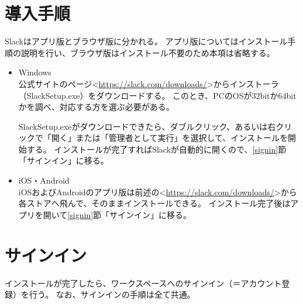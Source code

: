 \documentclass[lualatex,ja=standard,12pt,a4j]{bxjsbook}
\begin{document}
        \section{導入手順}
        	Slackはアプリ版とブラウザ版に分かれる。
            アプリ版についてはインストール手順の説明を行い、ブラウザ版はインストール不要のため本項は省略する。
        	\begin{itemize} 
            	\item Windows\\
                	公式サイトのページ<\url{https://slack.com/downloads/}>からインストーラ（SlackSetup.exe）をダウンロードする。
                    このとき、PCのOSが32bitか64bitかを調べ、対応する方を選ぶ必要がある。
                    
                    SlackSetup.exeがダウンロードできたら、ダブルクリック、あるいは右クリックで「開く」または「管理者として実行」を選択して、インストールを開始する。
                	インストールが完了すればSlackが自動的に開くので、\ref{signin}節「サインイン」に移る。
                    
              	\item iOS・Android\\
                	iOSおよびAndroidのアプリ版は前述の<\url{https://slack.com/downloads/}>から各ストアへ飛んで、そのままインストールできる。
                    インストール完了後はアプリを開いて\ref{signin}節「サインイン」に移る。
                    
            \end{itemize}
		\section{サインイン\label{signin}}
        	インストールが完了したら、ワークスペースへのサインイン（＝アカウント登録）を行う。
            なお、サインインの手順は全て共通。
            
\end{document}
